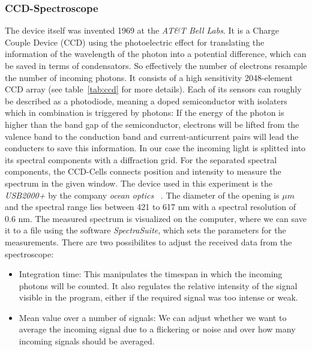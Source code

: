 \subsubsection{CCD-Spectroscope}
The device itself was invented 1969 at the 
\textit{AT\&T Bell Labs}. It is a Charge Couple Device (CCD) using
the photoelectric effect for translating the information of the 
wavelength
of the photon into a potential difference, which can be saved
in terms of condensators. So effectively the number of electrons
resample the number of incoming photons.
It consists of a high sensitivity 2048-element CCD array 
(see table~\ref{tab:ccd} for more details). Each of its sensors 
can roughly be described as a photodiode, meaning a doped
semiconductor with isolaters which in combination is triggered
by photons: If the energy of the photon is higher than the 
band gap of the semiconductor, electrons will be lifted from the
valence band to the conduction band and current-anticurrent pairs
will lead the conducters to save this information. In our case
the incoming light is splitted into its spectral components with
a diffraction grid. For the separated spectral components, the  
CCD-Cells connects position and intensity to measure the 
spectrum in the given window. 
The device used in this experiment is the \textit{USB2000+} 
by the company \textit{ocean optics}
~\cite{versuchsanleitung}. 
The diameter of the opening is $\mu m$ and the spectral range lies 
between 421 to 617 nm with a spectral resolution of 0.6 nm.
The measured spectrum is visualized on the computer, where we
can save it to a file using the software
\textit{SpectraSuite}, which sets the parameters for the 
measurements. There are two possibilites to adjust
the received data from the spectroscope:
\begin{itemize}
    \item Integration time: This manipulates the timespan in 
        which the incoming photons will be counted. It also
        regulates the relative intensity of the signal
        visible in the program, either
        if the required signal was too intense or weak.
    \item Mean value over a number of signals: We can adjust
        whether we want to average the incoming signal due to
        a flickering or noise and over how many incoming signals
        should be averaged.
\end{itemize}


